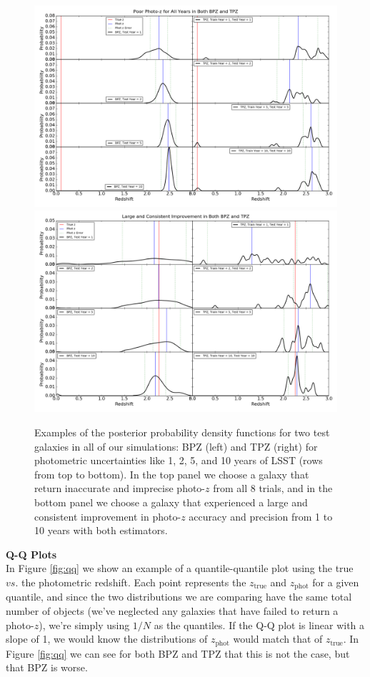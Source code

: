 \documentclass[DM,lsstdraft,toc]{lsstdoc}
\begin{document}
\begin{figure}
\begin{center}
\includegraphics[width=13cm]{figures/zpdf_g4.png}
\includegraphics[width=13cm]{figures/zpdf_g7.png}
\caption{Examples of the posterior probability density functions for two test galaxies in all of our simulations: BPZ (left) and TPZ (right) for photometric uncertainties like 1, 2, 5, and 10 years of LSST (rows from top to bottom). In the top panel we choose a galaxy that return inaccurate and imprecise photo-$z$ from all 8 trials, and in the bottom panel we choose a galaxy that experienced a large and consistent improvement in photo-$z$ accuracy and precision from 1 to 10 years with both estimators.  \label{fig:zpdf}}
\end{center}
\end{figure}

\smallskip \noindent \textbf{Q-Q Plots} \\
In Figure \ref{fig:qq} we show an example of a quantile-quantile plot using the true $vs.$ the photometric redshift. Each point represents the $z_\mathrm{true}$ and $z_\mathrm{phot}$ for a given quantile, and since the two distributions we are comparing have the same total number of objects (we've neglected any galaxies that have failed to return a photo-$z$), we're simply using $1/N$ as the quantiles. If the Q-Q plot is linear with a slope of 1, we would know the distributions of $z_\mathrm{phot}$ would match that of $z_\mathrm{true}$. In Figure \ref{fig:qq} we can see for both BPZ and TPZ that this is not the case, but that BPZ is worse.
\end{document}
